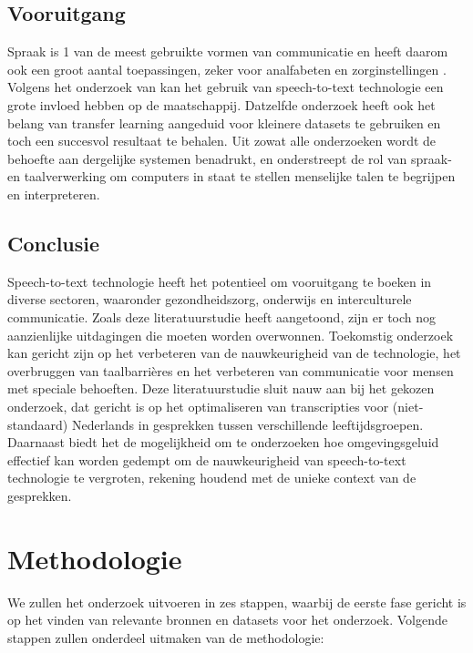 \subsection{Vooruitgang}
Spraak is 1 van de meest gebruikte vormen van communicatie en heeft daarom ook een groot aantal toepassingen, zeker voor analfabeten en zorginstellingen \autocite{Arun2021}. Volgens het onderzoek van \autocite{Roepke2019} kan het gebruik van speech-to-text technologie een grote invloed hebben op de maatschappij. Datzelfde onderzoek heeft ook het belang van transfer learning aangeduid voor kleinere datasets te gebruiken en toch een succesvol resultaat te behalen. Uit zowat alle onderzoeken wordt de behoefte aan dergelijke systemen benadrukt, en onderstreept de rol van spraak- en taalverwerking om computers in staat te stellen menselijke talen te begrijpen en interpreteren.

\subsection{Conclusie}
Speech-to-text technologie heeft het potentieel om vooruitgang te boeken in diverse sectoren, waaronder gezondheidszorg, onderwijs en interculturele communicatie. Zoals deze literatuurstudie heeft aangetoond, zijn er toch nog aanzienlijke uitdagingen die moeten worden overwonnen. Toekomstig onderzoek kan gericht zijn op het verbeteren van de nauwkeurigheid van de technologie, het overbruggen van taalbarrières en het verbeteren van communicatie voor mensen met speciale behoeften.
Deze literatuurstudie sluit nauw aan bij het gekozen onderzoek, dat gericht is op het optimaliseren van transcripties voor (niet-standaard) Nederlands in gesprekken tussen verschillende leeftijdsgroepen. Daarnaast biedt het de mogelijkheid om te onderzoeken hoe omgevingsgeluid effectief kan worden gedempt om de nauwkeurigheid van speech-to-text technologie te vergroten, rekening houdend met de unieke context van de gesprekken.

\section{Methodologie}%
\label{sec:methodologie}

We zullen het onderzoek uitvoeren in zes stappen, waarbij de eerste fase gericht is op het vinden van relevante bronnen en datasets voor het onderzoek. Volgende stappen zullen onderdeel uitmaken van de methodologie:


